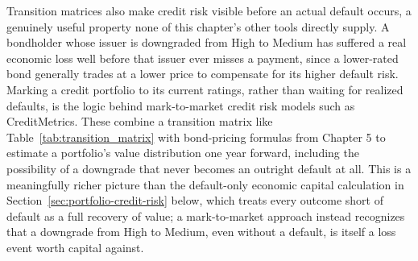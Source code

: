 \documentclass[../ai_in_finance]{subfiles}
\begin{document}
Transition matrices also make credit risk visible before an actual default occurs, a genuinely useful property none of this chapter's other tools directly supply. A bondholder whose issuer is downgraded from High to Medium has suffered a real economic loss well before that issuer ever misses a payment, since a lower-rated bond generally trades at a lower price to compensate for its higher default risk. Marking a credit portfolio to its current ratings, rather than waiting for realized defaults, is the logic behind mark-to-market credit risk models such as CreditMetrics. These combine a transition matrix like Table~\ref{tab:transition_matrix} with bond-pricing formulas from Chapter 5 to estimate a portfolio's value distribution one year forward, including the possibility of a downgrade that never becomes an outright default at all.
This is a meaningfully richer picture than the default-only economic capital calculation in Section~\ref{sec:portfolio-credit-risk} below, which treats every outcome short of default as a full recovery of value; a mark-to-market approach instead recognizes that a downgrade from High to Medium, even without a default, is itself a loss event worth capital against.
\end{document}
